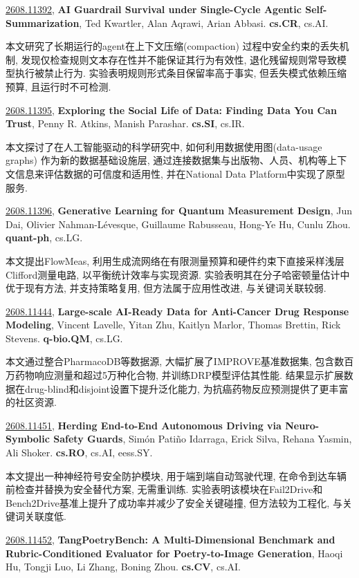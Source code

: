 \documentclass[9pt, a4paper]{article}
\theoremstyle{plain}
\theoremstyle{definition}
\theoremstyle{remark}
\newcommand{\arxivwithtarget}[3]{\hypertarget{#1}{}\href{https://arxiv.org/abs/#1}{#1}, \textbf{\textcolor{arxivblue}{#2}}, #3. }
\begin{document}
\arxivwithtarget{2608.11392}{AI Guardrail Survival under Single-Cycle Agentic Self-Summarization}{Ted Kwartler, Alan Aqrawi, Arian Abbasi}\textbf{cs.CR}, cs.AI.

本文研究了长期运行的agent在上下文压缩(compaction) 过程中安全约束的丢失机制, 发现仅检查规则文本存在性并不能保证其行为有效性, 退化残留规则常导致模型执行被禁止行为. 实验表明规则形式条目保留率高于事实, 但丢失模式依赖压缩预算, 且运行时不可检测.


\arxivwithtarget{2608.11395}{Exploring the Social Life of Data: Finding Data You Can Trust}{Penny R. Atkins, Manish Parashar}\textbf{cs.SI}, cs.IR.

本文探讨了在人工智能驱动的科学研究中, 如何利用数据使用图(data-usage graphs) 作为新的数据基础设施层, 通过连接数据集与出版物、人员、机构等上下文信息来评估数据的可信度和适用性, 并在National Data Platform中实现了原型服务.


\arxivwithtarget{2608.11396}{Generative Learning for Quantum Measurement Design}{Jun Dai, Olivier Nahman-Lévesque, Guillaume Rabusseau, Hong-Ye Hu, Cunlu Zhou}\textbf{quant-ph}, cs.LG.

本文提出FlowMeas, 利用生成流网络在有限测量预算和硬件约束下直接采样浅层Clifford测量电路, 以平衡统计效率与实现资源. 实验表明其在分子哈密顿量估计中优于现有方法, 并支持策略复用, 但方法属于应用性改进, 与关键词关联较弱.


\arxivwithtarget{2608.11444}{Large-scale AI-Ready Data for Anti-Cancer Drug Response Modeling}{Vincent Lavelle, Yitan Zhu, Kaitlyn Marlor, Thomas Brettin, Rick Stevens}\textbf{q-bio.QM}, cs.LG.

本文通过整合PharmacoDB等数据源, 大幅扩展了IMPROVE基准数据集, 包含数百万药物响应测量和超过5万种化合物, 并训练DRP模型评估其性能. 结果显示扩展数据在drug-blind和disjoint设置下提升泛化能力, 为抗癌药物反应预测提供了更丰富的社区资源.


\arxivwithtarget{2608.11451}{Herding End-to-End Autonomous Driving via Neuro-Symbolic Safety Guards}{Simón Patiño Idarraga, Erick Silva, Rehana Yasmin, Ali Shoker}\textbf{cs.RO}, cs.AI, eess.SY.

本文提出一种神经符号安全防护模块, 用于端到端自动驾驶代理, 在命令到达车辆前检查并替换为安全替代方案, 无需重训练. 实验表明该模块在Fail2Drive和Bench2Drive基准上提升了成功率并减少了安全关键碰撞, 但方法较为工程化, 与关键词关联度低.


\arxivwithtarget{2608.11452}{TangPoetryBench: A Multi-Dimensional Benchmark and Rubric-Conditioned Evaluator for Poetry-to-Image Generation}{Haoqi Hu, Tongji Luo, Li Zhang, Boning Zhou}\textbf{cs.CV}, cs.AI.
\end{document}

